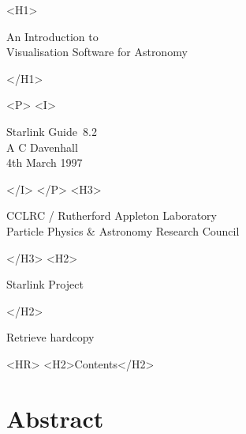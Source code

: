 \documentclass[twoside,11pt]{article}
\newcommand{\stardoccategory}  {Starlink Guide}
\newcommand{\stardocsource}    {sg\stardocnumber}
\newcommand{\stardocnumber}    {8.2}
\newcommand{\stardocauthors}   {A C Davenhall}
\newcommand{\stardocdate}      {4th March 1997}
\newcommand{\stardoctitle}     {An Introduction to \\ Visualisation
Software for Astronomy}
\newcommand{\htmladdnormallink}[2]{#1}
\newcommand{\htmladdimg}[1]{}
\newcommand{\htmlref}[2]{#1}
\newcommand{\htmladdtonavigation}[1]{}
\newcommand{\xlabel}[1]{}
\newcommand{\latexonlytoc}[0]{\tableofcontents}
\begin{document}
\begin{htmlonly}
   \xlabel{}
   \begin{rawhtml} <H1> \end{rawhtml}
      \stardoctitle
   \begin{rawhtml} </H1> \end{rawhtml}


   \begin{rawhtml} <P> <I> \end{rawhtml}
   \stardoccategory\ \stardocnumber \\
   \stardocauthors \\
   \stardocdate
   \begin{rawhtml} </I> </P> <H3> \end{rawhtml}
      \htmladdnormallink{CCLRC}{http://www.cclrc.ac.uk} /
      \htmladdnormallink{Rutherford Appleton Laboratory}
                        {http://www.cclrc.ac.uk/ral} \\
      \htmladdnormallink{Particle Physics \& Astronomy Research Council}
                        {http://www.pparc.ac.uk} \\
   \begin{rawhtml} </H3> <H2> \end{rawhtml}
      \htmladdnormallink{Starlink Project}{http://www.starlink.ac.uk/}
   \begin{rawhtml} </H2> \end{rawhtml}
   \htmladdnormallink{\htmladdimg{source.gif} Retrieve hardcopy}
      {http://www.starlink.ac.uk/cgi-bin/hcserver?\stardocsource}\\

  \label{stardoccontents}
  \begin{rawhtml}
    <HR>
    <H2>Contents</H2>
  \end{rawhtml}
  \newcommand{\latexonlytoc}[0]{}
  \htmladdtonavigation{\htmlref{\htmladdimg{contents_motif.gif}}
        {stardoccontents}}

  \section{\xlabel{abstract}Abstract}
\end{htmlonly}
\end{document}
